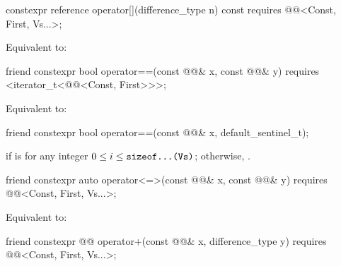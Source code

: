 \begin{itemdecl}
constexpr reference operator[](difference_type n) const
  requires @@<Const, First, Vs...>;
\end{itemdecl}

\begin{itemdescr}
\pnum
\effects
Equivalent to: 
\end{itemdescr}

\begin{itemdecl}
friend constexpr bool operator==(const @@& x, const @@& y)
  requires <iterator_t<@@<Const, First>>>;
\end{itemdecl}

\begin{itemdescr}
\pnum
\effects
Equivalent to: 
\end{itemdescr}

\begin{itemdecl}
friend constexpr bool operator==(const @@& x, default_sentinel_t);
\end{itemdecl}

\begin{itemdescr}
\pnum
\returns
{} if 
is 
for any integer $0 \le i \le \texttt{sizeof...(Vs)}$;
otherwise, .
\end{itemdescr}

\begin{itemdecl}
friend constexpr auto operator<=>(const @@& x, const @@& y)
  requires @@<Const, First, Vs...>;
\end{itemdecl}

\begin{itemdescr}
\pnum
\effects
Equivalent to: 
\end{itemdescr}

\begin{itemdecl}
friend constexpr @@ operator+(const @@& x, difference_type y)
  requires @@<Const, First, Vs...>;
\end{itemdecl}

